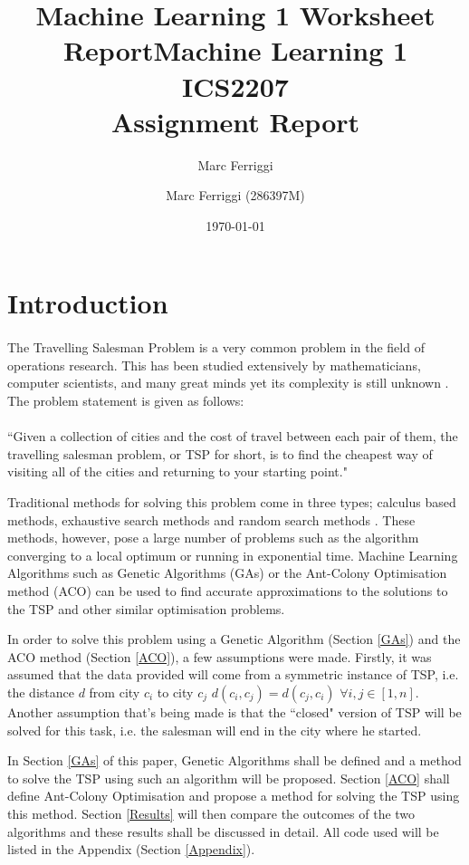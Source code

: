 \documentclass[11pt,a4paper,final]{article}
\author{Marc Ferriggi}
\title{Machine Learning 1 Worksheet Report}
\begin{document}
	\title{Machine Learning 1 \\
	\large ICS2207 \\ Assignment Report}
	\author{Marc Ferriggi (286397M)}
	\date{\today}
	\maketitle
	\tableofcontents
	
	\section{Introduction}
	\label{Intro}
	\paragraph{} The Travelling Salesman Problem is a very common problem in the field of operations research. This has been studied extensively by mathematicians, computer scientists, and many great minds yet its complexity is still unknown \cite{TSP}. The problem statement is given as follows:\\
	\hspace{0pt}\\
	``Given a collection of cities and the cost of travel between each pair of them, the travelling salesman problem, or TSP for short, is to find the cheapest way of visiting all of the cities and returning to your starting point." \cite{TSP}\\
	\par Traditional methods for solving this problem come in three types; calculus based methods, exhaustive search methods and random search methods \cite{Goldberg}. These methods, however, pose a large number of problems such as the algorithm converging to a local optimum or running in exponential time. Machine Learning Algorithms such as Genetic Algorithms (GAs) or the Ant-Colony Optimisation method (ACO) can be used to find accurate approximations to the solutions to the TSP and other similar optimisation problems. \\
	\par In order to solve this problem using a Genetic Algorithm (Section \ref{GAs}) and the ACO method (Section \ref{ACO}), a few assumptions were made. Firstly, it was assumed that the data provided will come from a symmetric instance of TSP, i.e. the distance $d$ from city $c_i$ to city $c_j$ $d(c_i,c_j)=d(c_j,c_i)$ $\forall i,j\in [1,n]$. Another assumption that's being made is that the ``closed" version of TSP will be solved for this task, i.e. the salesman will end in the city where he started.\\
	\par In Section \ref{GAs} of this paper, Genetic Algorithms shall be defined and a method to solve the TSP using such an algorithm will be proposed. Section \ref{ACO} shall define Ant-Colony Optimisation and propose a method for solving the TSP using this method. Section \ref{Results} will then compare the outcomes of the two algorithms and these results shall be discussed in detail. All code used will be listed in the Appendix (Section \ref{Appendix}). 
\end{document}
